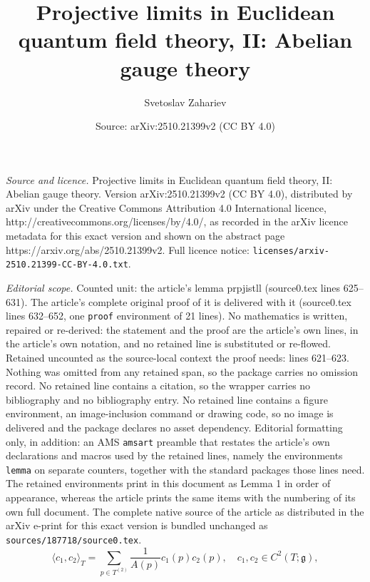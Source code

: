 \documentclass[10pt,a4paper]{amsart}
\title{Projective limits in Euclidean quantum field theory, II: Abelian gauge theory}
\author{Svetoslav Zahariev}
\date{Source: arXiv:2510.21399v2 (CC BY 4.0)}
\begin{document}
\maketitle

\noindent\emph{Source and licence.} Projective limits in Euclidean quantum field theory, II: Abelian gauge theory. Version arXiv:2510.21399v2 (CC BY 4.0), distributed by arXiv under the Creative Commons Attribution 4.0 International licence, http://creativecommons.org/licenses/by/4.0/, as recorded in the arXiv licence metadata for this exact version and shown on the abstract page https://arxiv.org/abs/2510.21399v2. Full licence notice: \texttt{licenses/arxiv-2510.21399-CC-BY-4.0.txt}.\par\smallskip

\noindent\textit{Editorial scope.} Counted unit: the article's lemma prpjistll (source0.tex lines 625--631). The article's complete original proof of it is delivered with it (source0.tex lines 632--652, one \texttt{proof} environment of 21 lines). No mathematics is written, repaired or re-derived: the statement and the proof are the article's own lines, in the article's own notation, and no retained line is substituted or re-flowed.  Retained uncounted as the source-local context the proof needs: lines 621--623.  Nothing was omitted from any retained span, so the package carries no omission record.  No retained line contains a citation, so the wrapper carries no bibliography and no bibliography entry.  No retained line contains a figure environment, an image-inclusion command or drawing code, so no image is delivered and the package declares no asset dependency.  Editorial formatting only, in addition: an AMS \texttt{amsart} preamble that restates the article's own declarations and macros used by the retained lines, namely the environments \texttt{lemma} on separate counters, together with the standard packages those lines need.  The retained environments print in this document as Lemma 1 in order of appearance, whereas the article prints the same items with the numbering of its own full document.  The complete native source of the article as distributed in the arXiv e-print for this exact version is bundled unchanged as \texttt{sources/187718/source0.tex}.
\begin{equation}\label{areanorminn}
\langle c_1, c_2 \rangle_T=\sum_{p \in T^{(2)}} \frac{1}{A(p)}c_1(p)c_2(p),\quad c_1,c_2 \in C^2(T;\mathfrak{g}),
\end{equation}
\end{document}

